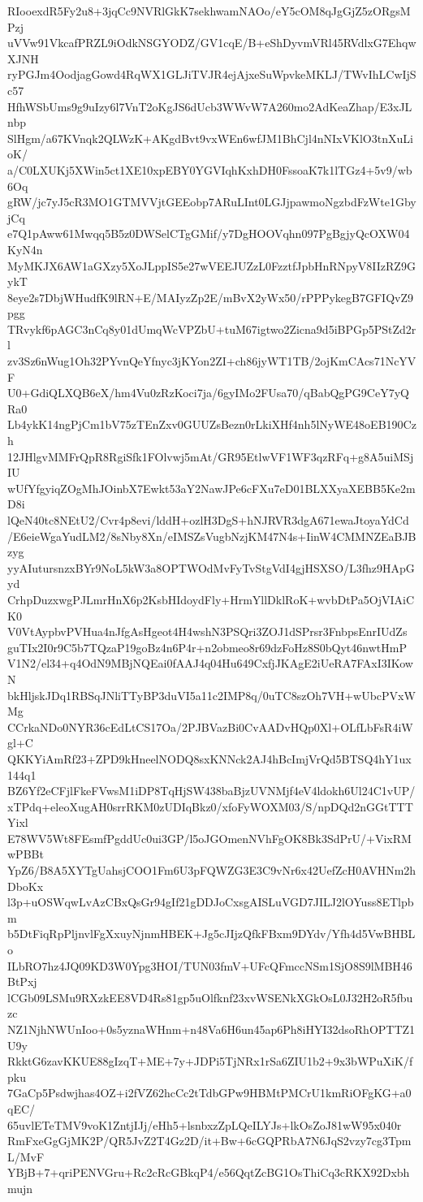 RIooexdR5Fy2u8+3jqCc9NVRlGkK7sekhwamNAOo/eY5cOM8qJgGjZ5zORgsMPzj
uVVw91VkcafPRZL9iOdkNSGYODZ/GV1cqE/B+eShDyvmVRl45RVdlxG7EhqwXJNH
ryPGJm4OodjagGowd4RqWX1GLJiTVJR4ejAjxeSuWpvkeMKLJ/TWvIhLCwIjSc57
HfhWSbUms9g9uIzy6l7VnT2oKgJS6dUcb3WWvW7A260mo2AdKeaZhap/E3xJLnbp
SlHgm/a67KVnqk2QLWzK+AKgdBvt9vxWEn6wfJM1BhCjl4nNIxVKlO3tnXuLioK/
a/C0LXUKj5XWin5ct1XE10xpEBY0YGVIqhKxhDH0FssoaK7k1lTGz4+5v9/wb6Oq
gRW/jc7yJ5cR3MO1GTMVVjtGEEobp7ARuLInt0LGJjpawmoNgzbdFzWte1GbyjCq
e7Q1pAww61Mwqq5B5z0DWSelCTgGMif/y7DgHOOVqhn097PgBgjyQcOXW04KyN4n
MyMKJX6AW1aGXzy5XoJLppIS5e27wVEEJUZzL0FzztfJpbHnRNpyV8IIzRZ9GykT
8eye2s7DbjWHudfK9lRN+E/MAIyzZp2E/mBvX2yWx50/rPPPykegB7GFIQvZ9pgg
TRvykf6pAGC3nCq8y01dUmqWcVPZbU+tuM67igtwo2Zicna9d5iBPGp5PStZd2rl
zv3Sz6nWug1Oh32PYvnQeYfnyc3jKYon2ZI+ch86jyWT1TB/2ojKmCAcs71NcYVF
U0+GdiQLXQB6eX/hm4Vu0zRzKoci7ja/6gyIMo2FUsa70/qBabQgPG9CeY7yQRa0
Lb4ykK14ngPjCm1bV75zTEnZxv0GUUZsBezn0rLkiXHf4nh5lNyWE48oEB190Czh
12JHlgvMMFrQpR8RgiSfk1FOlvwj5mAt/GR95EtlwVF1WF3qzRFq+g8A5uiMSjIU
wUfYfgyiqZOgMhJOinbX7Ewkt53aY2NawJPe6cFXu7eD01BLXXyaXEBB5Ke2mD8i
lQeN40tc8NEtU2/Cvr4p8evi/lddH+ozlH3DgS+hNJRVR3dgA671ewaJtoyaYdCd
/E6eieWgaYudLM2/8sNby8Xn/eIMSZsVugbNzjKM47N4s+IinW4CMMNZEaBJBzyg
yyAIutursnzxBYr9NoL5kW3a8OPTWOdMvFyTvStgVdI4gjHSXSO/L3fhz9HApGyd
CrhpDuzxwgPJLmrHnX6p2KsbHIdoydFly+HrmYllDklRoK+wvbDtPa5OjVIAiCK0
V0VtAypbvPVHua4nJfgAsHgeot4H4wshN3PSQri3ZOJ1dSPrsr3FnbpsEnrIUdZs
guTIx2I0r9C5b7TQzaP19goBz4n6P4r+n2obmeo8r69dzFoHz8S0bQyt46nwtHmP
V1N2/el34+q4OdN9MBjNQEai0fAAJ4q04Hu649CxfjJKAgE2iUeRA7FAxI3IKowN
bkHljskJDq1RBSqJNliTTyBP3duVI5a11c2IMP8q/0uTC8szOh7VH+wUbcPVxWMg
CCrkaNDo0NYR36cEdLtCS17Oa/2PJBVazBi0CvAADvHQp0Xl+OLfLbFsR4iWgl+C
QKKYiAmRf23+ZPD9kHneelNODQ8sxKNNck2AJ4hBcImjVrQd5BTSQ4hY1ux144q1
BZ6Yf2eCFjlFkeFVwsM1iDP8TqHjSW438baBjzUVNMjf4eV4ldokh6Ul24C1vUP/
xTPdq+eleoXugAH0srrRKM0zUDIqBkz0/xfoFyWOXM03/S/npDQd2nGGtTTTYixl
E78WV5Wt8FEsmfPgddUc0ui3GP/l5oJGOmenNVhFgOK8Bk3SdPrU/+VixRMwPBBt
YpZ6/B8A5XYTgUahsjCOO1Fm6U3pFQWZG3E3C9vNr6x42UefZcH0AVHNm2hDboKx
l3p+uOSWqwLvAzCBxQsGr94gIf21gDDJoCxsgAISLuVGD7JILJ2lOYuss8ETlpbm
b5DtFiqRpPljnvlFgXxuyNjnmHBEK+Jg5cJIjzQfkFBxm9DYdv/Yfh4d5VwBHBLo
ILbRO7hz4JQ09KD3W0Ypg3HOI/TUN03fmV+UFcQFmccNSm1SjO8S9lMBH46BtPxj
lCGb09LSMu9RXzkEE8VD4Rs81gp5uOlfknf23xvWSENkXGkOsL0J32H2oR5fbuzc
NZ1NjhNWUnIoo+0s5yznaWHnm+n48Va6H6un45ap6Ph8iHYI32dsoRhOPTTZ1U9y
RkktG6zavKKUE88gIzqT+ME+7y+JDPi5TjNRx1rSa6ZIU1b2+9x3bWPuXiK/fpku
7GaCp5Psdwjhas4OZ+i2fVZ62hcCc2tTdbGPw9HBMtPMCrU1kmRiOFgKG+a0qEC/
65uvlETeTMV9voK1ZntjIJj/eHh5+lsnbxzZpLQeILYJs+lkOsZoJ81wW95x040r
RmFxeGgGjMK2P/QR5JvZ2T4Gz2D/it+Bw+6cGQPRbA7N6JqS2vzy7cg3TpmL/MvF
YBjB+7+qriPENVGru+Rc2cRcGBkqP4/e56QqtZcBG1OsThiCq3cRKX92Dxbhmujn
